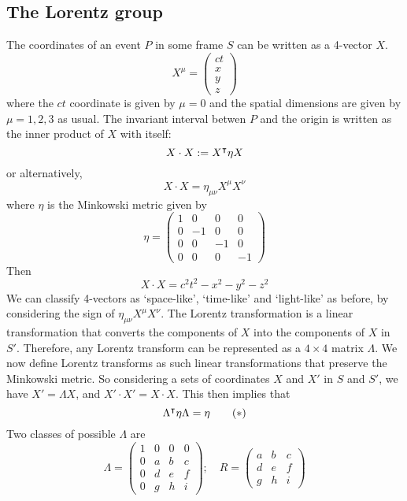 \subsection{The Lorentz group}
The coordinates of an event \(P\) in some frame \(S\) can be written as a 4-vector \(X\).
\[
	X^\mu = \begin{pmatrix}
		ct \\ x \\ y \\ z
	\end{pmatrix}
\]
where the \(ct\) coordinate is given by \(\mu = 0\) and the spatial dimensions are given by \(\mu = 1, 2, 3\) as usual.
The invariant interval betwen \(P\) and the origin is written as the inner product of \(X\) with itself:
\[
	X \cdot X := X^\intercal \eta X
\]
or alternatively,
\[
	X \cdot X = \eta_{\mu\nu} X^\mu X^\nu
\]
where \(\eta\) is the Minkowski metric given by
\[
	\eta = \begin{pmatrix}
		1 & 0  & 0  & 0  \\
		0 & -1 & 0  & 0  \\
		0 & 0  & -1 & 0  \\
		0 & 0  & 0  & -1
	\end{pmatrix}
\]
Then
\[
	X \cdot X = c^2t^2 - x^2 - y^2 - z^2
\]
We can classify 4-vectors as `space-like', `time-like' and `light-like' as before, by considering the sign of \(\eta_{\mu\nu}X^\mu X^\nu\).
The Lorentz transformation is a linear transformation that converts the components of \(X\) into the components of \(X\) in \(S'\).
Therefore, any Lorentz transform can be represented as a \(4\times 4\) matrix \(\Lambda\).
We now define Lorentz transforms as such linear transformations that preserve the Minkowski metric.
So considering a sets of coordinates \(X\) and \(X'\) in \(S\) and \(S'\), we have \(X' = \Lambda X\), and \(X' \cdot X' = X \cdot X\).
This then implies that
\begin{equation}
	\Lambda^\intercal \eta \Lambda = \eta \tag{\(\ast\)}
\end{equation}
Two classes of possible \(\Lambda\) are
\[
	\Lambda = \begin{pmatrix}
		1 & 0 & 0 & 0 \\
		0 & a & b & c \\
		0 & d & e & f \\
		0 & g & h & i
	\end{pmatrix};\quad R = \begin{pmatrix}
		a & b & c \\
		d & e & f \\
		g & h & i
	\end{pmatrix}
\]
